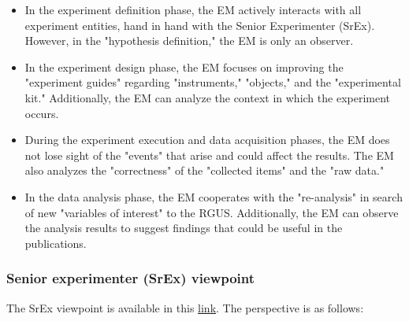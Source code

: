 \begin{itemize}
	\item In the experiment definition phase, the EM actively interacts with all experiment entities, hand in hand with the Senior Experimenter (SrEx). However, in the "hypothesis definition," the EM is only an observer.
	\item In the experiment design phase, the EM focuses on improving the "experiment guides" regarding "instruments," "objects," and the "experimental kit." Additionally, the EM can analyze the context in which the experiment occurs.
	\item During the experiment execution and data acquisition phases, the EM does not lose sight of the "events" that arise and could affect the results. The EM also analyzes the "correctness" of the "collected items" and the "raw data."
	\item In the data analysis phase, the EM cooperates with the "re-analysis" in search of new "variables of interest" to the RGUS. Additionally, the EM can observe the analysis results to suggest findings that could be useful in the publications.
\end{itemize}

\subsubsection{Senior experimenter (SrEx) viewpoint}
The SrEx viewpoint is available in this \href{https://zenodo.org/record/7102464#.Yyxl4ezMLUJ}{\ul{link}}. The perspective is as follows:

